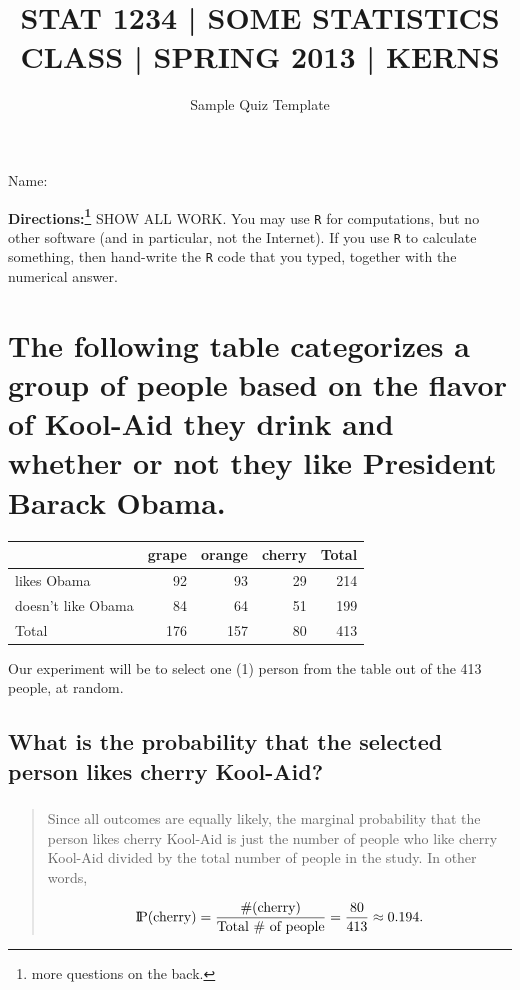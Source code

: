 \documentclass[11pt]{article}
\date{\vspace{-0.5in}Sample Quiz Template}
\title{\vspace{-0.5in}\large STAT 1234 | SOME STATISTICS CLASS | SPRING 2013 | KERNS}
\begin{document}
\maketitle
\begin{flushright}
Name: \underbar{\makebox[2in]{}}
\par
\end{flushright}
\vspace{0.1in}

\noindent \textbf{Directions:\footnote{more questions on the back.}} SHOW ALL WORK. You may use \texttt{R} for
computations, but no other software (and in particular, not the
Internet). If you use \texttt{R} to calculate something, then hand-write the
\texttt{R} code that you typed, together with the numerical answer.

\section[The following table categorizes a group of people based on the flavor of Kool-Aid they drink and whether or not they like President Barack Obama.]{The following table categorizes a group of people based on the flavor of Kool-Aid they drink and whether or not they like President Barack Obama.}
\label{sec-1}

\begin{center}
\begin{tabular}{lrrrr}
 & grape & orange & cherry & Total\\
\hline
likes Obama & 92 & 93 & 29 & 214\\
doesn't like Obama & 84 & 64 & 51 & 199\\
Total & 176 & 157 & 80 & 413\\
\end{tabular}
\end{center}

Our experiment will be to select one (1) person from the table out
of the 413 people, at random.

\subsection[What is the probability that the selected person likes cherry Kool-Aid?]{What is the probability that the selected person likes cherry Kool-Aid?}
\label{sec-1-1}
\subsubsection[]{}
\label{sec-1-1-1}
\begin{quote}
Since all outcomes are equally likely, the marginal probability that
the person likes cherry Kool-Aid is just the number
of people who like cherry Kool-Aid divided by the
total number of people in the study.  In other words,

\[
\P( \mbox{cherry}) = \frac{\mbox{\#(cherry)}}{\mbox{Total \# of people}} = \frac{80}{413}\approx 0.194.
\]

\end{quote}
\end{document}
